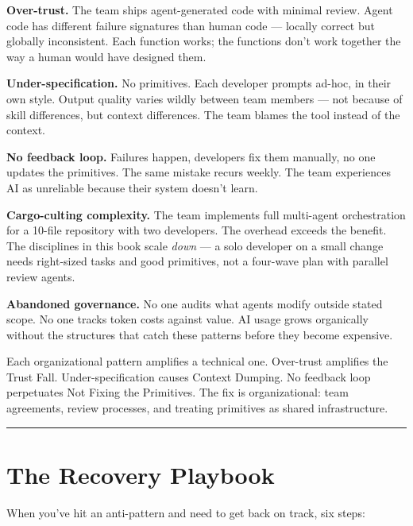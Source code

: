 \documentclass[
  a4paper,
  DIV=11,
  numbers=noendperiod]{scrreprt}
\begin{document}
\textbf{Over-trust.} The team ships agent-generated code with minimal
review. Agent code has different failure signatures than human code ---
locally correct but globally inconsistent. Each function works; the
functions don't work together the way a human would have designed them.

\textbf{Under-specification.} No primitives. Each developer prompts
ad-hoc, in their own style. Output quality varies wildly between team
members --- not because of skill differences, but context differences.
The team blames the tool instead of the context.

\textbf{No feedback loop.} Failures happen, developers fix them
manually, no one updates the primitives. The same mistake recurs weekly.
The team experiences AI as unreliable because their system doesn't
learn.

\textbf{Cargo-culting complexity.} The team implements full multi-agent
orchestration for a 10-file repository with two developers. The overhead
exceeds the benefit. The disciplines in this book scale \emph{down} ---
a solo developer on a small change needs right-sized tasks and good
primitives, not a four-wave plan with parallel review agents.

\textbf{Abandoned governance.} No one audits what agents modify outside
stated scope. No one tracks token costs against value. AI usage grows
organically without the structures that catch these patterns before they
become expensive.

Each organizational pattern amplifies a technical one. Over-trust
amplifies the Trust Fall. Under-specification causes Context Dumping. No
feedback loop perpetuates Not Fixing the Primitives. The fix is
organizational: team agreements, review processes, and treating
primitives as shared infrastructure.

\begin{center}\rule{0.5\linewidth}{0.5pt}\end{center}

\section{The Recovery Playbook}\label{the-recovery-playbook}

When you've hit an anti-pattern and need to get back on track, six
steps:
\end{document}
